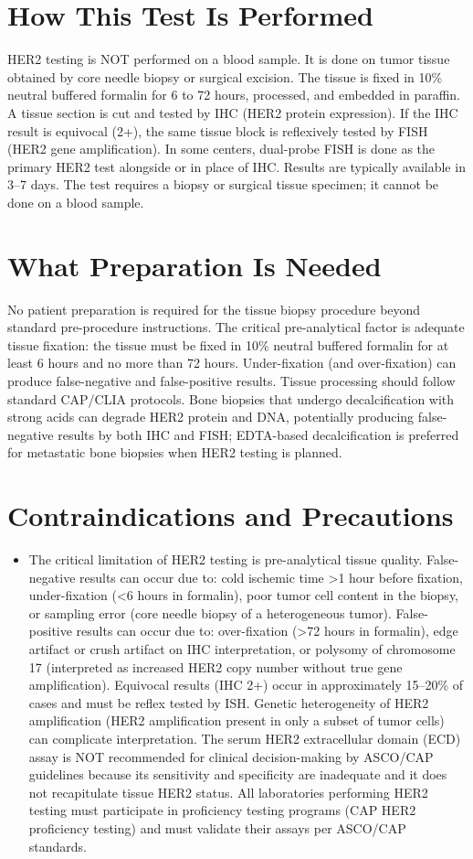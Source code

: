 \section*{How This Test Is Performed}
HER2 testing is NOT performed on a blood sample. It is done on tumor tissue obtained by core needle biopsy or surgical excision. The tissue is fixed in 10\% neutral buffered formalin for 6 to 72 hours, processed, and embedded in paraffin. A tissue section is cut and tested by IHC (HER2 protein expression). If the IHC result is equivocal (2+), the same tissue block is reflexively tested by FISH (HER2 gene amplification). In some centers, dual-probe FISH is done as the primary HER2 test alongside or in place of IHC. Results are typically available in 3--7 days. The test requires a biopsy or surgical tissue specimen; it cannot be done on a blood sample.

\section*{What Preparation Is Needed}
No patient preparation is required for the tissue biopsy procedure beyond standard pre-procedure instructions. The critical pre-analytical factor is adequate tissue fixation: the tissue must be fixed in 10\% neutral buffered formalin for at least 6 hours and no more than 72 hours. Under-fixation (and over-fixation) can produce false-negative and false-positive results. Tissue processing should follow standard CAP/CLIA protocols. Bone biopsies that undergo decalcification with strong acids can degrade HER2 protein and DNA, potentially producing false-negative results by both IHC and FISH; EDTA-based decalcification is preferred for metastatic bone biopsies when HER2 testing is planned.

\section*{Contraindications and Precautions}
\begin{itemize}
  \item The critical limitation of HER2 testing is pre-analytical tissue quality. False-negative results can occur due to: cold ischemic time >1 hour before fixation, under-fixation (<6 hours in formalin), poor tumor cell content in the biopsy, or sampling error (core needle biopsy of a heterogeneous tumor). False-positive results can occur due to: over-fixation (>72 hours in formalin), edge artifact or crush artifact on IHC interpretation, or polysomy of chromosome 17 (interpreted as increased HER2 copy number without true gene amplification). Equivocal results (IHC 2+) occur in approximately 15--20\% of cases and must be reflex tested by ISH. Genetic heterogeneity of HER2 amplification (HER2 amplification present in only a subset of tumor cells) can complicate interpretation. The serum HER2 extracellular domain (ECD) assay is NOT recommended for clinical decision-making by ASCO/CAP guidelines because its sensitivity and specificity are inadequate and it does not recapitulate tissue HER2 status. All laboratories performing HER2 testing must participate in proficiency testing programs (CAP HER2 proficiency testing) and must validate their assays per ASCO/CAP standards.
\end{itemize}
